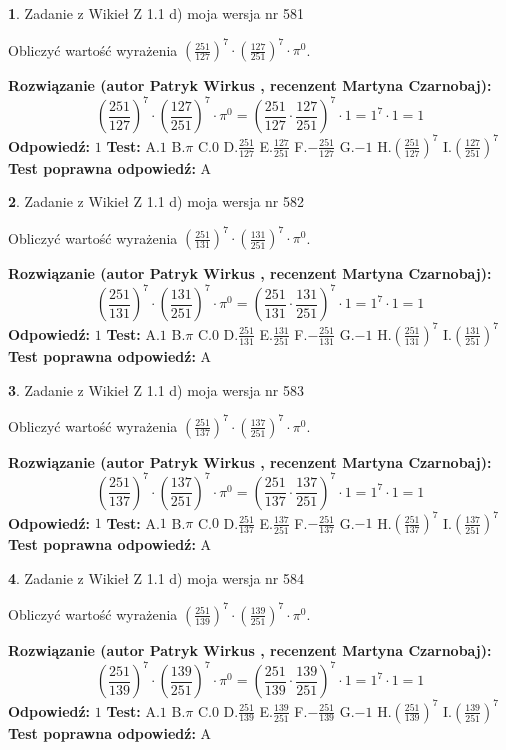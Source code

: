 \documentclass[12pt, a4paper]{article}
\theoremstyle{definition} %
\newtheorem{zad}{}
\newcommand{\zadStart}[1]{\begin{zad}#1\newline}
\newcommand{\zadStop}{\end{zad}}
\newcommand{\rozwStart}[2]{\noindent \textbf{Rozwiązanie (autor #1 , recenzent #2): }\newline}
\newcommand{\rozwStop}{\newline}
\newcommand{\odpStart}{\noindent \textbf{Odpowiedź:}\newline}
\newcommand{\odpStop}{\newline}
\newcommand{\testStart}{\noindent \textbf{Test:}\newline}
\newcommand{\testStop}{\newline}
\newcommand{\kluczStart}{\noindent \textbf{Test poprawna odpowiedź:}\newline}
\newcommand{\kluczStop}{\newline}
\begin{document}
\zadStart{Zadanie z Wikieł Z 1.1 d) moja wersja nr 581}

Obliczyć wartość wyrażenia $(\frac{251}{127})^{7} \cdot (\frac{127}{251})^{7} \cdot \pi^{0}$.
\zadStop
\rozwStart{Patryk Wirkus}{Martyna Czarnobaj}
$$(\frac{251}{127})^{7} \cdot (\frac{127}{251})^{7} \cdot \pi^{0} = (\frac{251}{127} \cdot \frac{127}{251})^{7} \cdot 1 = 1^{7} \cdot 1 = 1$$
\rozwStop
\odpStart
$1$
\odpStop
\testStart
A.$1$ B.$\pi$ C.$0$ D.$\frac{251}{127}$ E.$\frac{127}{251}$
F.$-\frac{251}{127}$ G.$-1$
H.$(\frac{251}{127})^{7}$
I.$(\frac{127}{251})^{7}$
\testStop
\kluczStart
A
\kluczStop



\zadStart{Zadanie z Wikieł Z 1.1 d) moja wersja nr 582}

Obliczyć wartość wyrażenia $(\frac{251}{131})^{7} \cdot (\frac{131}{251})^{7} \cdot \pi^{0}$.
\zadStop
\rozwStart{Patryk Wirkus}{Martyna Czarnobaj}
$$(\frac{251}{131})^{7} \cdot (\frac{131}{251})^{7} \cdot \pi^{0} = (\frac{251}{131} \cdot \frac{131}{251})^{7} \cdot 1 = 1^{7} \cdot 1 = 1$$
\rozwStop
\odpStart
$1$
\odpStop
\testStart
A.$1$ B.$\pi$ C.$0$ D.$\frac{251}{131}$ E.$\frac{131}{251}$
F.$-\frac{251}{131}$ G.$-1$
H.$(\frac{251}{131})^{7}$
I.$(\frac{131}{251})^{7}$
\testStop
\kluczStart
A
\kluczStop



\zadStart{Zadanie z Wikieł Z 1.1 d) moja wersja nr 583}

Obliczyć wartość wyrażenia $(\frac{251}{137})^{7} \cdot (\frac{137}{251})^{7} \cdot \pi^{0}$.
\zadStop
\rozwStart{Patryk Wirkus}{Martyna Czarnobaj}
$$(\frac{251}{137})^{7} \cdot (\frac{137}{251})^{7} \cdot \pi^{0} = (\frac{251}{137} \cdot \frac{137}{251})^{7} \cdot 1 = 1^{7} \cdot 1 = 1$$
\rozwStop
\odpStart
$1$
\odpStop
\testStart
A.$1$ B.$\pi$ C.$0$ D.$\frac{251}{137}$ E.$\frac{137}{251}$
F.$-\frac{251}{137}$ G.$-1$
H.$(\frac{251}{137})^{7}$
I.$(\frac{137}{251})^{7}$
\testStop
\kluczStart
A
\kluczStop



\zadStart{Zadanie z Wikieł Z 1.1 d) moja wersja nr 584}

Obliczyć wartość wyrażenia $(\frac{251}{139})^{7} \cdot (\frac{139}{251})^{7} \cdot \pi^{0}$.
\zadStop
\rozwStart{Patryk Wirkus}{Martyna Czarnobaj}
$$(\frac{251}{139})^{7} \cdot (\frac{139}{251})^{7} \cdot \pi^{0} = (\frac{251}{139} \cdot \frac{139}{251})^{7} \cdot 1 = 1^{7} \cdot 1 = 1$$
\rozwStop
\odpStart
$1$
\odpStop
\testStart
A.$1$ B.$\pi$ C.$0$ D.$\frac{251}{139}$ E.$\frac{139}{251}$
F.$-\frac{251}{139}$ G.$-1$
H.$(\frac{251}{139})^{7}$
I.$(\frac{139}{251})^{7}$
\testStop
\kluczStart
A
\kluczStop
\end{document}

